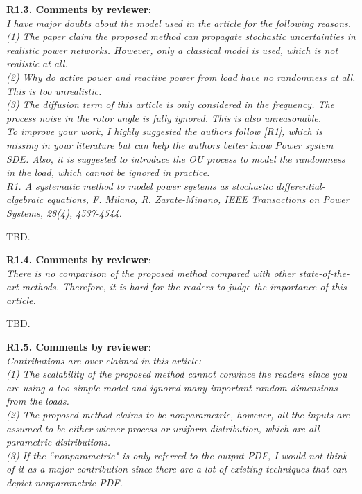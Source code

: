\documentclass[12pt,onecolumn]{IEEEtran}
\newcommand{\blue}{\color{blue}}
\newcommand{\nib}{\noindent  {\bf Response:} }
\begin{document}
\noindent
{\bf R1.3. Comments by reviewer}:\\
{\em I have major doubts about the model used in the article for the following reasons.\\
(1)     The paper claim the proposed method can propagate stochastic uncertainties in realistic power networks. However, only a classical model is used, which is not realistic at all.\\
(2)     Why do active power and reactive power from load have no randomness at all. This is too unrealistic.\\
(3)     The diffusion term of this article is only considered in the frequency. The process noise in the rotor angle is fully ignored. This is also unreasonable.\\
To improve your work, I highly suggested the authors follow [R1], which is missing in your literature but can help the authors better know Power system SDE.  Also, it is suggested to introduce the OU process to model the randomness in the load, which cannot be ignored in practice.\\
R1. A systematic method to model power systems as stochastic differential-algebraic equations, F. Milano, R. Zarate-Minano, IEEE Transactions on Power Systems, 28(4), 4537-4544.}

{\nib{ \blue TBD.}}



\noindent
{\bf R1.4. Comments by reviewer}:\\
{\em There is no comparison of the proposed method compared with other state-of-the-art methods. Therefore, it is hard for the readers to judge the importance of this article.}

{\nib{ \blue TBD.}}


\noindent
{\bf R1.5. Comments by reviewer}:\\
{\em Contributions are over-claimed in this article:\\
(1) The scalability of the proposed method cannot convince the readers since you are using a too simple model and ignored many important random dimensions from the loads.\\
(2) The proposed method claims to be nonparametric, however, all the inputs are assumed to be either wiener process or uniform distribution, which are all parametric distributions.\\
(3) If the ``nonparametric" is only referred to the output PDF, I would not think of it as a major contribution since there are a lot of existing techniques that can depict nonparametric PDF.}
\end{document}

